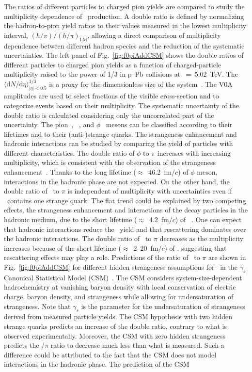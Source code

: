 The ratios of different particles to charged pion yields are compared to study the multiplicity dependence of \fzero~production. A double ratio is defined by normalizing the hadron-to-pion yield ratios to their values measured in the lowest multiplicity interval, $(h/\pi)/(h/\pi)_{\mathrm{LM}}$, allowing a direct comparison of multiplicity dependence between different hadron species and the reduction of the systematic uncertainties. The left panel of Fig.~\ref{fig:f0piAddCSM} shows the double ratios of different particles to charged pion yields as a function of charged-particle multiplicity raised to the power of 1/3 in p--Pb collisions at \snn~=~5.02~TeV. The $\langle \mathrm{d}N/\mathrm{d}\eta \rangle_{|\eta|<0.5}^{1/3}$ is a proxy for the dimensionless size of the system~\cite{Liu:2018xae}. The V0A amplitudes are used to select fractions of the visible cross-section and to categorize events based on their multiplicity. The systematic uncertainty of the double ratio is calculated considering only the uncorrelated part of the uncertainty. The pion~\cite{ALICE:2016dei}, \kstar~\cite{ALICE:2016sak}, and $\phi$~\cite{ALICE:2016sak} mesons can be classified according to their lifetimes and to their (anti-)strange quarks. The strangeness enhancement and hadronic interactions can be studied by comparing the yield of particles with different characteristics. The double ratio of $\phi$ to $\pi$ increases with increasing multiplicity, which is consistent with the observation of the strangeness enhancement~\cite{ALICE:2016fzo}. Thanks to the long lifetime ($\approx$~46.2~fm/$c$) of $\phi$ meson, interactions in the hadronic phase are not expected. On the other hand, the double ratio of \kstar~to $\pi$ is independent of multiplicity with uncertainties even if \kstar~contains one strange quark. The flat trend could be explained by two competing effects, the strangeness enhancement and interactions of the decay particles in the hadronic medium, due to the short lifetime ($\approx$~4.2~fm/$c$) of \kstar~\cite{ParticleDataGroup:2022pth}. One can expect that hadronic interactions reduce the \kstar~yield and that rescattering dominates over the hadronic interactions. The double ratio of \fzero~to $\pi$ decreases as the multiplicity increases because of the short lifetime ($\approx$~2--20~fm/$c$) of \fzero, suggesting that rescattering effects may play a role. Predictions of the ratio of \fzero~to $\pi$ are shown in Fig.~\ref{fig:f0piAddCSM} for different hidden strangeness assumptions for \fzero~in the $\gamma_{s}$-Canonical Statistical Model (CSM)~\cite{Vovchenko:2019kes}. The CSM considers system-size-dependent hadrochemistry at vanishing baryon density with local conservation of electric charge, baryon density, and strangeness while allowing for undersaturation of strangeness. Note that $\gamma_{s}$ is the parameter for the undersaturation of strangeness derived from measured particle yields. The CSM hypothesis with two hidden strange quarks predicts an increase of the double ratio, contrary to what is observed experimentally. Moreover, the CSM with zero hidden strangeness predicts the \fzero/$\pi$ ratio to decrease much less than what is measured. Such a difference could be attributed to the fact that the CSM does not model interactions in the hadronic phase. The prediction of the CSM 
